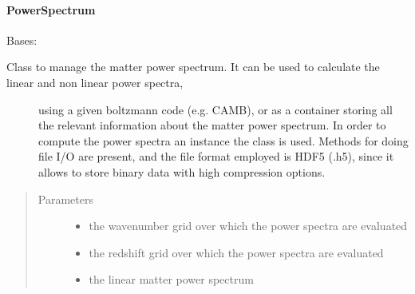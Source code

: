 \documentclass[letterpaper,10pt,english]{sphinxmanual}
\begin{document}
\paragraph{PowerSpectrum}
\label{\detokenize{api/seyfert.cosmology.power_spectrum.PowerSpectrum:powerspectrum}}\label{\detokenize{api/seyfert.cosmology.power_spectrum.PowerSpectrum::doc}}

\begin{fulllineitems}
\label{\detokenize{api/seyfert.cosmology.power_spectrum.PowerSpectrum:seyfert.cosmology.power_spectrum.PowerSpectrum}}
\sphinxAtStartPar
Bases: 
\begin{description}
\item[{Class to manage the matter power spectrum. It can be used to calculate the linear and non linear power spectra,}] \leavevmode
\sphinxAtStartPar
using a given boltzmann code (e.g. CAMB), or as a container storing all the relevant information about the matter
power spectrum. In order to compute the power spectra an instance the class  is
used. Methods for doing file I/O are present, and the file format employed is HDF5 (.h5), since it allows to store
binary data with high compression options.

\end{description}
\begin{quote}\begin{description}
\item[{Parameters}] \leavevmode\begin{itemize}
\item {} 
\sphinxAtStartPar
{} \textendash{} the wavenumber grid over which the power spectra are evaluated

\item {} 
\sphinxAtStartPar
{} \textendash{} the redshift grid over which the power spectra are evaluated

\item {} 
\sphinxAtStartPar
{} \textendash{} the linear matter power spectrum


\end{itemize}
\end{description}
\end{quote}
\end{fulllineitems}
\end{document}
